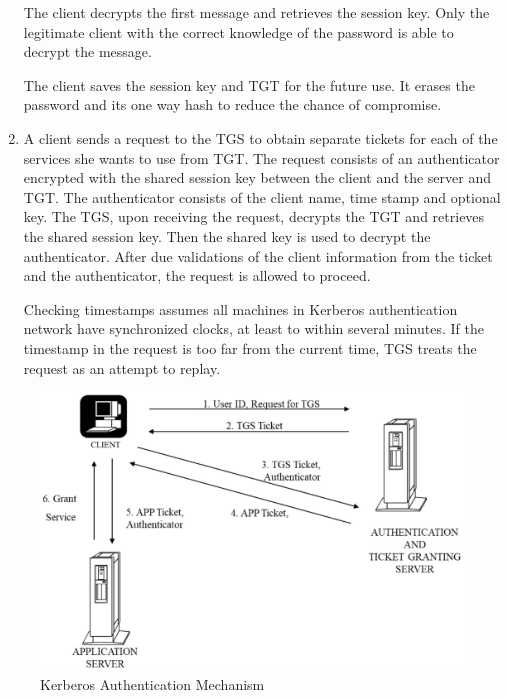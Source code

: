\begin{multicols}{2}
\begin{enumerate}
The client decrypts the first message and retrieves the session key. Only the legitimate client with the correct knowledge of the password is able to decrypt the message.

The client saves the session key and TGT for the future use. It erases the password and its one way hash to reduce the chance of compromise.

\item A client sends a request to the TGS to obtain separate tickets for each of the services she wants to use from TGT. The request consists of an authenticator encrypted with the shared session key between the client and the server and TGT. The authenticator consists of the client name, time stamp and optional key. The TGS, upon receiving the request, decrypts the TGT and retrieves the shared session key. Then the shared key is used to decrypt the authenticator. After due validations of the client information from the ticket and the authenticator, the request is allowed to proceed.

Checking timestamps assumes all machines in Kerberos authentication network have synchronized clocks, at least to within several minutes. If the timestamp in the request is too far from the current time, TGS treats the request as an attempt to replay.
\end{enumerate}
\end{multicols}

\begin{figure}[!ht]
\centering
\includegraphics[scale=.85]{src/Figures/chap2/3.eps}
\caption{Kerberos Authentication Mechanism}\label{chap2-fig3}
\end{figure}

